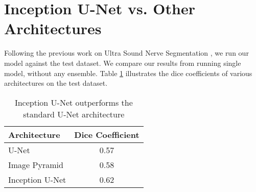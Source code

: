 \section{Inception U-Net vs. Other Architectures}

Following the previous work on Ultra Sound Nerve Segmentation \cite{jocicmarko-ultrasound-segmentation}, we run our model against the test dataset. We compare our results from running single model, without any ensemble. Table \ref{tab:arch_compare} illustrates the dice coefficients of various architectures on the test dataset.

\begin{table}[h]
	\centering
	\begin{tabular}{l c}
	\toprule
	Architecture & Dice Coefficient \\
	\midrule
	\midrule
 	U-Net & 0.57 \\
	Image Pyramid & 0.58 \\
	Inception U-Net & 0.62 \\
	\bottomrule
		
	\end{tabular}
	\caption{Inception U-Net outperforms the standard U-Net architecture}
\label{tab:arch_compare}
\end{table}